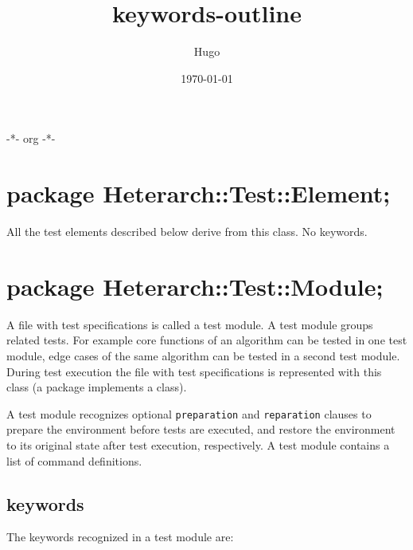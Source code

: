 \documentclass[11pt]{article}
\author{Hugo}
\date{\today}
\title{keywords-outline}
\begin{document}
\maketitle
\tableofcontents

-*- org -*-

\section{package Heterarch::Test::Element;}
\label{sec-1}
All the test elements described below derive from this class.
No keywords.

\section{package Heterarch::Test::Module;}
\label{sec-2}
A file with test specifications is called a test module.  A test
module groups related tests.  For example core functions of an
algorithm can be tested in one test module, edge cases of the same
algorithm can be tested in a second test module.  During test
execution the file with test specifications is represented with this
class (a package implements a class).

A test module recognizes optional \verb~preparation~ and \verb~reparation~
clauses to prepare the environment before tests are executed, and
restore the environment to its original state after test execution,
respectively.  A test module contains a list of command definitions.

\subsection{keywords}
\label{sec-2-1}
The keywords recognized in a test module are:
\end{document}
